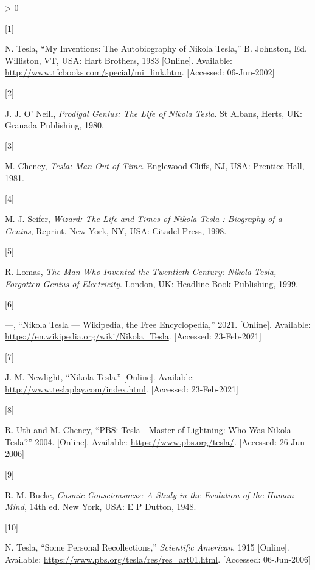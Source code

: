 \documentclass[
  11pt,
  a4paper,
]{article}
\newlength{\cslhangindent}
\newlength{\csllabelwidth}
\newenvironment{CSLReferences}[2] %
 {%
  \setlength{\parindent}{0pt}
  \ifodd #1 \everypar{\setlength{\hangindent}{\cslhangindent}}\ignorespaces\fi
  \ifnum #2 > 0
  \setlength{\parskip}{#2\baselineskip}
  \fi
 }%
 {}
\newcommand{\CSLLeftMargin}[1]{\parbox[t]{\csllabelwidth}{#1}}
\newcommand{\CSLRightInline}[1]{\parbox[t]{\linewidth - \csllabelwidth}{#1}\break}
\begin{document}
\hypertarget{refs}{}
\begin{CSLReferences}{0}{0}
\leavevmode\hypertarget{ref-john83}{}%
\CSLLeftMargin{{[}1{]} }
\CSLRightInline{N. Tesla, {``{My Inventions: The Autobiography of Nikola
Tesla},''} B. Johnston, Ed. Williston, VT, USA: Hart Brothers, 1983
{[}Online{]}. Available:
\url{http://www.tfcbooks.com/special/mi_link.htm}. {[}Accessed:
06-Jun-2002{]}}

\leavevmode\hypertarget{ref-oneill80}{}%
\CSLLeftMargin{{[}2{]} }
\CSLRightInline{J. J. O' Neill, \emph{{Prodigal Genius: The Life of
Nikola Tesla}}. St Albans, Herts, UK: Granada Publishing, 1980. }

\leavevmode\hypertarget{ref-cheney81}{}%
\CSLLeftMargin{{[}3{]} }
\CSLRightInline{M. Cheney, \emph{{Tesla: Man Out of Time}}. Englewood
Cliffs, NJ, USA: Prentice-Hall, 1981. }

\leavevmode\hypertarget{ref-seifer98}{}%
\CSLLeftMargin{{[}4{]} }
\CSLRightInline{M. J. Seifer, \emph{{Wizard: The Life and Times of
Nikola Tesla : Biography of a Genius}}, Reprint. New York, NY, USA:
Citadel Press, 1998. }

\leavevmode\hypertarget{ref-lomas99}{}%
\CSLLeftMargin{{[}5{]} }
\CSLRightInline{R. Lomas, \emph{{The Man Who Invented the Twentieth
Century: Nikola Tesla, Forgotten Genius of Electricity}}. London, UK:
Headline Book Publishing, 1999. }

\leavevmode\hypertarget{ref-tesla-wiki}{}%
\CSLLeftMargin{{[}6{]} }
\CSLRightInline{---, {``{N}ikola {T}esla --- {Wikipedia}{,} the {F}ree
{E}ncyclopedia,''} 2021. {[}Online{]}. Available:
\url{https://en.wikipedia.org/wiki/Nikola_Tesla}. {[}Accessed:
23-Feb-2021{]}}

\leavevmode\hypertarget{ref-tesla-home}{}%
\CSLLeftMargin{{[}7{]} }
\CSLRightInline{J. M. Newlight, {``{Nikola Tesla}.''} {[}Online{]}.
Available: \url{http://www.teslaplay.com/index.html}. {[}Accessed:
23-Feb-2021{]}}

\leavevmode\hypertarget{ref-tesla-pbs-bio}{}%
\CSLLeftMargin{{[}8{]} }
\CSLRightInline{R. Uth and M. Cheney, {``{PBS: Tesla---Master of
Lightning: Who Was Nikola Tesla?}''} 2004. {[}Online{]}. Available:
\url{https://www.pbs.org/tesla/}. {[}Accessed: 26-Jun-2006{]}}

\leavevmode\hypertarget{ref-bucke48}{}%
\CSLLeftMargin{{[}9{]} }
\CSLRightInline{R. M. Bucke, \emph{{Cosmic Consciousness: A Study in the
Evolution of the Human Mind}}, 14th ed. New York, USA: E P Dutton, 1948.
}

\leavevmode\hypertarget{ref-tesla-personal}{}%
\CSLLeftMargin{{[}10{]} }
\CSLRightInline{N. Tesla, {``{Some Personal Recollections},''}
\emph{Scientific American}, 1915 {[}Online{]}. Available:
\url{https://www.pbs.org/tesla/res/res_art01.html}. {[}Accessed:
06-Jun-2006{]}}


\end{CSLReferences}
\end{document}
